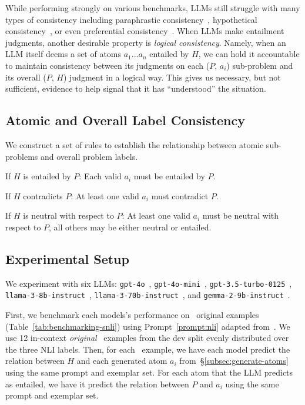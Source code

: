 

While performing strongly on various benchmarks, LLMs still struggle with many types of consistency including paraphrastic consistency~\cite{srikanth2024often, verma-etal-2023-evaluating}, hypothetical consistency~\cite{chen2023two}, or even preferential consistency~\cite{zhao2024measuring}.
%
When LLMs make entailment judgments, another desirable property is \textit{logical consistency}.
%
Namely, when an LLM itself deems a set of atoms $a_1$...$a_n$ entailed by $H$, we can hold it accountable to maintain consistency between its judgments on each ($P$, $a_i$) sub-problem and its overall ($P$, $H$) judgment in a logical way.
%
This gives us necessary, but not sufficient, evidence to help signal that it has ``understood'' the situation.

\subsection{Atomic and Overall Label Consistency}
\label{sec:snli-atoms:rules}
We construct a set of rules to establish the relationship between atomic sub-problems and overall problem labels.
%
\vspace{-0.5em}
\begin{tight_enumerate}
    \item If $H$ is entailed by $P$: Each valid $a_i$ must be entailed by $P$.
    \item If $H$ contradicts $P$: At least one valid $a_i$ must contradict $P$.
    \item If $H$ is neutral with respect to $P$: At least one valid $a_i$ must be neutral with respect to $P$, all others may be either neutral or entailed.
\end{tight_enumerate}

\subsection{Experimental Setup}
We experiment with six LLMs: \texttt{gpt-4o}~\cite{openai2024gpt4o}, \texttt{gpt-4o-mini}~\cite{openai2024gpt4o}, \texttt{gpt-3.5-turbo-0125}~\cite{ouyang2022training}, \texttt{llama-3-8b-instruct}~\cite{dubey2024llama}, \texttt{llama-3-70b-instruct}~\cite{dubey2024llama}, and \texttt{gemma-2-9b-instruct}~\cite{team2024gemma}.
%

First, we benchmark each models's performance on \snlitest~original examples (Table~\ref{tab:benchmarking-snli}) using Prompt~\ref{prompt:nli} adapted from~\citet{liu2023evaluating}.
%
We use 12 in-context \textit{original} \snli~examples from the dev split evenly distributed over the three NLI labels.
%
Then, for each \snlitest~example, we have each model predict the relation between $H$ and each generated atom $a_i$ from~\S\ref{subsec:generate-atoms} using the same prompt and exemplar set.
%
For each atom that the LLM predicts as entailed, we have it predict the relation between $P$ and $a_i$ using the same prompt and exemplar set.
%

